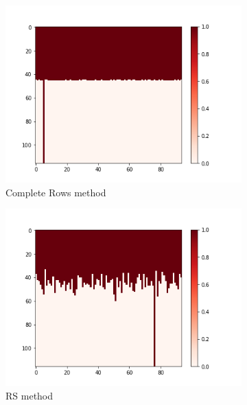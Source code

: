 \documentclass[10pt, conference, compsocconf]{IEEEtran}
\begin{document}
\begin{figure}[h!]
\begin{subfigure}[b]{0.4\linewidth}
  		\includegraphics[width=\columnwidth]{figures/5vs7_rows_04_training}
  		\caption{Complete Rows method}
  		\label{fig:Rows-Sample-Training-set}
	\end{subfigure}
	\begin{subfigure}[b]{0.4\linewidth}
 		\includegraphics[width=\columnwidth]{figures/5vs7_random-real_04_training}
		\caption{RS method}
  		\label{fig:Uniform-S-Sample-Training-set}
	\end{subfigure}
	\begin{subfigure}[b]{0.4\linewidth}

\end{subfigure}
\end{figure}
\end{document}
